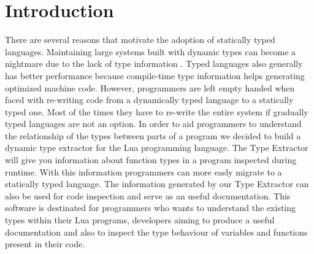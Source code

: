 
\chapter{Introduction}
There are several reasons that motivate the adoption of statically typed languages. Maintaining large systems built with dynamic types can become a nightmare due to the lack of type information \cite{takikawa_is_2016}. Typed languages also generally has better performance because compile-time type information helps generating optimized machine code. However, programmers are left empty handed when faced with re-writing code from a dynamically typed language to a statically typed one. Most of the times they have to re-write the entire system if gradually typed languages are not an option.
\newline
In order to aid programmers to understand the relationship of the types between parts of a program we decided to build a dynamic type extractor for the Lua programming language. The Type Extractor will give you information about function types in a program inspected during runtime. With this information programmers can more easly migrate to a statically typed language. The information generated by our Type Extractor can also be used for code inspection and serve as an useful documentation.
\newline
This software is destinated for programmers who wants to understand the existing types within their Lua programs, developers aiming to produce a useful documentation and also to inspect the type behaviour of variables and functions present in their code.






